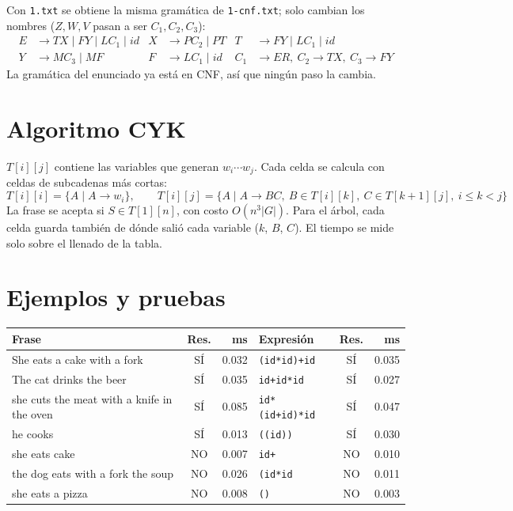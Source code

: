 \documentclass[11pt,letterpaper]{article}
\newcommand{\g}[1]{\texttt{#1}}
\begin{document}
Con \g{1.txt} se obtiene la misma gramática de \g{1-cnf.txt}; solo cambian los nombres ($Z,W,V$ pasan a ser $C_1,C_2,C_3$):
\[
\begin{aligned}
E &\to TX \mid FY \mid LC_1 \mid id & X &\to PC_2 \mid PT & T &\to FY \mid LC_1 \mid id\\
Y &\to MC_3 \mid MF & F &\to LC_1 \mid id & C_1 &\to ER,\ C_2\to TX,\ C_3\to FY
\end{aligned}
\]
La gramática del enunciado ya está en CNF, así que ningún paso la cambia.

\section{Algoritmo CYK}

$T[i][j]$ contiene las variables que generan $w_i\cdots w_j$. Cada celda se calcula con celdas de subcadenas más cortas:
\[
T[i][i]=\{A \mid A\to w_i\},\qquad
T[i][j]=\{A \mid A\to BC,\ B\in T[i][k],\ C\in T[k+1][j],\ i\le k<j\}
\]
La frase se acepta si $S\in T[1][n]$, con costo $O(n^3|G|)$. Para el árbol, cada celda guarda también de dónde salió cada variable ($k$, $B$, $C$). El tiempo se mide solo sobre el llenado de la tabla.

\section{Ejemplos y pruebas}

\begin{center}\small
\begin{tabular}{@{}lcr@{\qquad}lcr@{}}
\toprule
Frase & Res. & ms & Expresión & Res. & ms\\ \midrule
She eats a cake with a fork & SÍ & 0.032 & \g{(id*id)+id} & SÍ & 0.035\\
The cat drinks the beer & SÍ & 0.035 & \g{id+id*id} & SÍ & 0.027\\
she cuts the meat with a knife in the oven & SÍ & 0.085 & \g{id*(id+id)*id} & SÍ & 0.047\\
he cooks & SÍ & 0.013 & \g{((id))} & SÍ & 0.030\\
she eats cake & NO & 0.007 & \g{id+} & NO & 0.010\\
the dog eats with a fork the soup & NO & 0.026 & \g{(id*id} & NO & 0.011\\
she eats a pizza & NO & 0.008 & \g{()} & NO & 0.003\\
\bottomrule
\end{tabular}
\end{center}
\end{document}
